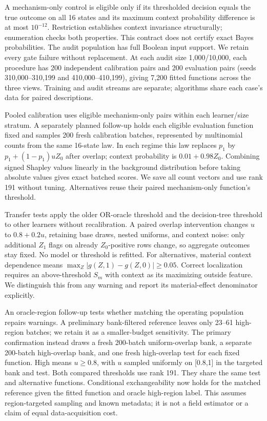 \documentclass[conference]{IEEEtran}
\begin{document}
A mechanism-only control is eligible only if its thresholded decision equals the true outcome on all 16 states and its maximum context probability difference is at most $10^{-12}$. Restriction establishes context invariance structurally; enumeration checks both properties. This contract does not certify exact Bayes probabilities. The audit population has full Boolean input support. We retain every gate failure without replacement. At each audit size 1{,}000/10{,}000, each procedure has 200 independent calibration pairs and 200 evaluation pairs (seeds 310{,}000--310{,}199 and 410{,}000--410{,}199), giving 7{,}200 fitted functions across the three views. Training and audit streams are separate; algorithms share each case's data for paired descriptions.

Pooled calibration uses eligible mechanism-only pairs within each learner/size stratum. A separately planned follow-up holds each eligible evaluation function fixed and samples 200 fresh calibration batches, represented by multinomial counts from the same 16-state law. In each regime this law replaces $p_1$ by $p_1+(1-p_1)uZ_0$ after overlap; context probability is $0.01+0.98Z_0$. Combining signed Shapley values linearly in the background distribution before taking absolute values gives exact batched scores. We save all count vectors and use rank 191 without tuning. Alternatives reuse their paired mechanism-only function's threshold.

Transfer tests apply the older OR-oracle threshold and the decision-tree threshold to other learners without recalibration. A paired overlap intervention changes $u$ to $0.8+0.2u$, retaining base draws, nested uniforms, and context noise: only additional $Z_1$ flags on already $Z_0$-positive rows change, so aggregate outcomes stay fixed. No model or threshold is refitted. For alternatives, material context dependence means $\max_Z|g(Z,1)-g(Z,0)|\geq0.05$. Correct localization requires an above-threshold $S_m$ with context as its maximizing outside feature. We distinguish this from any warning and report its material-effect denominator explicitly.

An oracle-region follow-up tests whether matching the operating population repairs warnings. A preliminary bank-filtered reference leaves only 23--61 high-region batches; we retain it as a smaller-budget sensitivity. The primary confirmation instead draws a fresh 200-batch uniform-overlap bank, a separate 200-batch high-overlap bank, and one fresh high-overlap test for each fixed function. High means $u\geq0.8$, with $u$ sampled uniformly on [0.8,1] in the targeted bank and test. Both compared thresholds use rank 191. They share the same test and alternative functions. Conditional exchangeability now holds for the matched reference given the fitted function and oracle high-region label. This assumes region-targeted sampling and known metadata; it is not a field estimator or a claim of equal data-acquisition cost.
\end{document}

